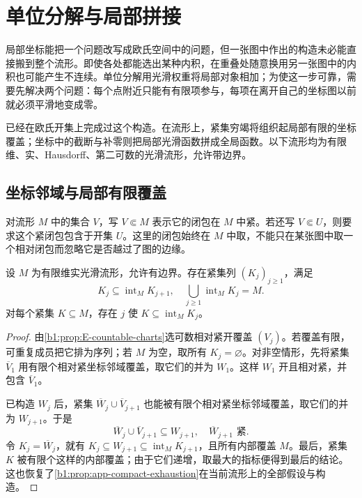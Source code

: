 \section{单位分解与局部拼接}
\label{b1:sec:E102}

局部坐标能把一个问题改写成欧氏空间中的问题，但一张图中作出的构造未必能直接搬到整个流形。即使各处都能选出某种内积，在重叠处随意换用另一张图中的内积也可能产生不连续。单位分解用光滑权重将局部对象相加；为使这一步可靠，需要先解决两个问题：每个点附近只能有有限项参与，每项在离开自己的坐标图以前就必须平滑地变成零。

\ProseParagraphBreak

已经在欧氏开集上完成过这个构造。在流形上，紧集穷竭将组织起局部有限的坐标覆盖；坐标中的截断与补零则把局部光滑函数拼成全局函数。以下流形均为有限维、实、Hausdorff、第二可数的光滑流形，允许带边界。

\subsection{坐标邻域与局部有限覆盖}
\label{b1:subsec:E10201}

对流形 \(M\) 中的集合 \(V\)，写 \(V\Subset M\) 表示它的闭包在 \(M\) 中紧。若还写 \(V\Subset U\)，则要求这个紧闭包包含于开集 \(U\)。这里的闭包始终在 \(M\) 中取，不能只在某张图中取一个相对闭包而忽略它是否越过了图的边缘。

\begin{proposition}[流形的紧集穷竭]\label{b1:prop:E-compact-exhaustion}
设 \(M\) 为有限维实光滑流形，允许有边界。存在紧集列 \((K_j)_{j\geq1}\)，满足
\[
 K_j\subseteq\operatorname{int}_M K_{j+1},
 \quad \bigcup_{j\geq1}\operatorname{int}_M K_j=M.
\]
对每个紧集 \(K\subseteq M\)，存在 \(j\) 使 \(K\subseteq\operatorname{int}_M K_j\)。
\end{proposition}
\begin{proof}
由\cref{b1:prop:E-countable-charts}选可数相对紧开覆盖 \((V_j)\)。若覆盖有限，可重复成员把它排为序列；若 \(M\) 为空，取所有 \(K_j=\varnothing\)。对非空情形，先将紧集 \(\overline V_1\) 用有限个相对紧坐标邻域覆盖，取它们的并为 \(W_1\)。这样 \(W_1\) 开且相对紧，并包含 \(\overline V_1\)。

已构造 \(W_j\) 后，紧集 \(\overline W_j\cup\overline V_{j+1}\) 也能被有限个相对紧坐标邻域覆盖，取它们的并为 \(W_{j+1}\)。于是
\[
 \overline W_j\cup\overline V_{j+1}\subseteq W_{j+1},
 \quad\overline W_{j+1}\text{ 紧}.
\]
令 \(K_j=\overline W_j\)，就有 \(K_j\subseteq W_{j+1}\subseteq\operatorname{int}_M K_{j+1}\)，且所有内部覆盖 \(M\)。最后，紧集 \(K\) 被有限个这样的内部覆盖；由于它们递增，取最大的指标便得到最后的结论。这也恢复了\cref{b1:prop:app-compact-exhaustion}在当前流形上的全部假设与构造。
\end{proof}

